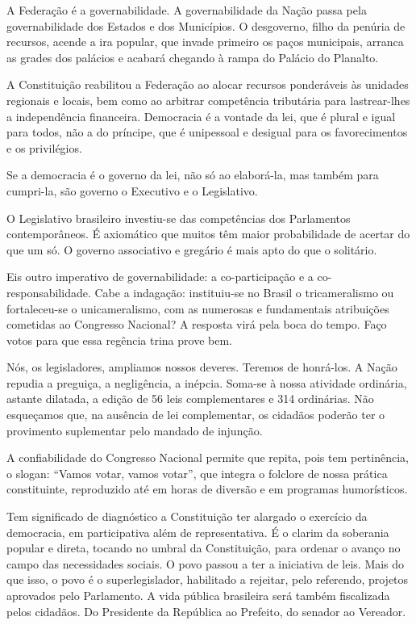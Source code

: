 A Federação é a governabilidade. A governabilidade da Nação passa pela
governabilidade dos Estados e dos Municípios. O desgoverno, filho da
penúria de recursos, acende a ira popular, que invade primeiro os paços
municipais, arranca as grades dos palácios e acabará chegando à rampa do
Palácio do Planalto.

A Constituição reabilitou a Federação ao alocar recursos ponderáveis às
unidades regionais e locais, bem como ao arbitrar competência tributária
para lastrear-lhes a independência financeira. Democracia é a vontade da
lei, que é plural e igual para todos, não a do príncipe, que é
unipessoal e desigual para os favorecimentos e os privilégios.

Se a democracia é o governo da lei, não só ao elaborá-la, mas também
para cumpri-la, são governo o Executivo e o Legislativo.

O Legislativo brasileiro investiu-se das competências dos Parlamentos
contemporâneos. É axiomático que muitos têm maior probabilidade de
acertar do que um só. O governo associativo e gregário é mais apto do
que o solitário.

Eis outro imperativo de governabilidade: a co-participação e a
co-responsabilidade. Cabe a indagação: instituiu-se no Brasil o
tricameralismo ou fortaleceu-se o unicameralismo, com as numerosas e
fundamentais atribuições cometidas ao Congresso Nacional? A resposta
virá pela boca do tempo. Faço votos para que essa regência trina prove
bem.

Nós, os legisladores, ampliamos nossos deveres. Teremos de honrá-los. A
Nação repudia a preguiça, a negligência, a inépcia. Soma-se à nossa
atividade ordinária, astante dilatada, a edição de 56 leis
complementares e 314 ordinárias. Não esqueçamos que, na ausência de lei
complementar, os cidadãos poderão ter o provimento suplementar pelo
mandado de injunção.

A confiabilidade do Congresso Nacional permite que repita, pois tem
pertinência, o slogan: ``Vamos votar, vamos votar'', que integra o
folclore de nossa prática constituinte, reproduzido até em horas de
diversão e em programas humorísticos.

Tem significado de diagnóstico a Constituição ter alargado o exercício
da democracia, em participativa além de representativa. É o clarim da
soberania popular e direta, tocando no umbral da Constituição, para
ordenar o avanço no campo das necessidades sociais. O povo passou a ter
a iniciativa de leis. Mais do que isso, o povo é o superlegislador,
habilitado a rejeitar, pelo referendo, projetos aprovados pelo
Parlamento. A vida pública brasileira será também fiscalizada pelos
cidadãos. Do Presidente da República ao Prefeito, do senador ao
Vereador.

